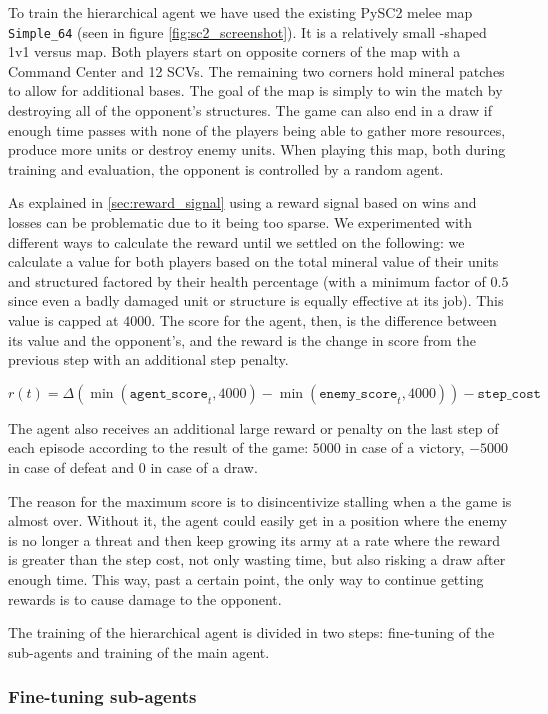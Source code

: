To train the hierarchical agent we have used the existing PySC2 melee map \texttt{Simple\_64} (seen in figure \ref{fig:sc2_screenshot}). It is a relatively small -shaped 1v1 versus map. Both players start on opposite corners of the map with a Command Center and 12 SCVs. The remaining two corners hold mineral patches to allow for additional bases. The goal of the map is simply to win the match by destroying all of the opponent's structures. The game can also end in a draw if enough time passes with none of the players being able to gather more resources, produce more units or destroy enemy units. When playing this map, both during training and evaluation, the opponent is controlled by a random agent.

As explained in \ref{sec:reward_signal} using a reward signal based on wins and losses can be problematic due to it being too sparse. We experimented with different ways to calculate the reward until we settled on the following: we calculate a value for both players based on the total mineral value of their units and structured factored by their health percentage (with a minimum factor of $0.5$ since even a badly damaged unit or structure is equally effective at its job). This value is capped at $4000$. The score for the agent, then, is the difference between its value and the opponent's, and the reward is the change in score from the previous step with an additional step penalty.

$$
r(t) = \Delta(\min(\texttt{agent\_score}_{t}, 4000) - \min(\texttt{enemy\_score}_{t}, 4000)) - \texttt{step\_cost}
$$

The agent also receives an additional large reward or penalty on the last step of each episode according to the result of the game: $5000$ in case of a victory, $-5000$ in case of defeat and $0$ in case of a draw.

The reason for the maximum score is to disincentivize stalling when a the game is almost over. Without it, the agent could easily get in a position where the enemy is no longer a threat and then keep growing its army at a rate where the reward is greater than the step cost, not only wasting time, but also risking a draw after enough time. This way, past a certain point, the only way to continue getting rewards is to cause damage to the opponent.

The training of the hierarchical agent is divided in two steps: fine-tuning of the sub-agents and training of the main agent.

\subsubsection*{Fine-tuning sub-agents}

